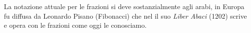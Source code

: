 La notazione attuale per le frazioni si deve sostanzialmente agli arabi, 
in Europa fu diffusa da Leonardo Pisano (Fibonacci) che nel il suo 
\emph{Liber Abaci} (1202) scrive e opera con le frazioni come oggi le 
conosciamo.

